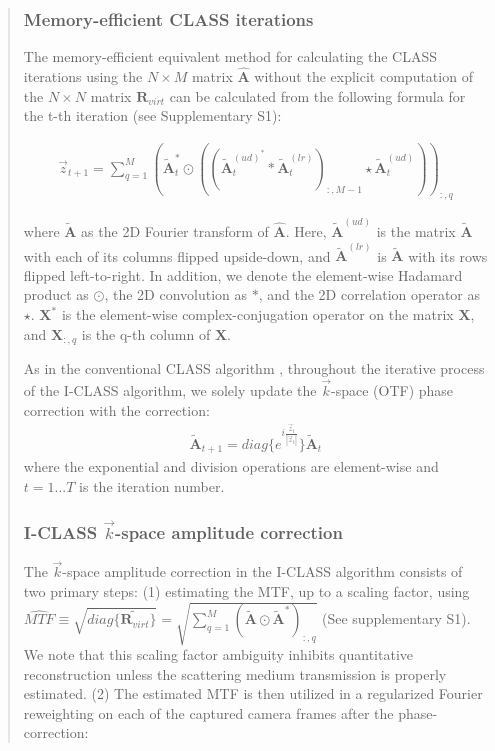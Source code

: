 \documentclass[12pt]{article}
\newenvironment{ourresponse}
    {\begin{tcolorbox}[width=\linewidth,breakable,enhanced,colback=gray!5,colframe=responsecolor!50,title=Response,left=5pt,right=5pt]}
    {\end{tcolorbox}}
\begin{document}
\begin{enumerate}[label=\arabic*.]
\begin{ourresponse}
\begin{quote}
            \subsubsection*{Memory-efficient CLASS iterations}
            
            The memory-efficient equivalent method for calculating the CLASS iterations using the $N \times M$ matrix $\hat{\textbf{A}}$ without the explicit computation of the $N \times N$ matrix $\textbf{R}_{virt}$ can be calculated from the following formula for the t-th iteration (see Supplementary S1): 
            
            \begin{eqnarray}
            \vec{z}_{t+1}=\sum_{q=1}^{M}(\tilde{\textbf{A}}_t^* \odot ((\tilde{\textbf{A}}_t^{(ud)^*}*\tilde{\textbf{A}}_t^{(lr)})_{:,M-1} \star \tilde{\textbf{A}}_t^{(ud)}))_{:,q}
            \label{eq:three}
            \end{eqnarray}
            
            \noindent where $\tilde{\textbf{A}}$ as the 2D Fourier transform of $\hat{\textbf{A}}$. Here, $\tilde{\textbf{A}}^{(ud)}$ is the matrix $\tilde{\textbf{A}}$ with each of its columns flipped upside-down, and $\tilde{\textbf{A}}^{(lr)}$ is $\tilde{\textbf{A}}$ with its rows flipped left-to-right. In addition, we denote the element-wise Hadamard product as $\odot$, the 2D convolution as $*$, and the 2D correlation operator as $\star$. $\textbf{X}^{*}$ is the element-wise complex-conjugation operator on the matrix $\textbf{X}$, and $\textbf{X}_{:,q}$ is the q-th column of $\textbf{X}$.
            
            As in the conventional CLASS algorithm \cite{kang17}, throughout the iterative process of the I-CLASS algorithm, we solely update the $\vec{k}$-space (OTF) phase correction with the correction:
            \begin{eqnarray}
            \tilde{\textbf{A}}_{t+1}=diag\{e^{i\frac{\vec{z}_t}{|\vec{z}_t|}}\}\tilde{\textbf{A}}_t
            \end{eqnarray}
            \noindent where the exponential and division operations are element-wise and $t=1...T$ is the iteration number. 
             \subsubsection*{I-CLASS $\vec{k}$-space amplitude correction}
            
            The $\vec{k}$-space amplitude correction in the I-CLASS algorithm consists of two primary steps: (1) estimating the MTF, up to a scaling factor, using $\widehat{MTF} \equiv  \sqrt{diag\{ \tilde{\textbf{R}_{virt}} \}} = \sqrt{\sum_{q=1}^{M} (\tilde{\textbf{A}} \odot \tilde{\textbf{A}}^*)_{:,q}}$ (See supplementary S1). We note that this scaling factor ambiguity inhibits quantitative reconstruction unless the scattering medium transmission is properly estimated. (2) The estimated MTF is then utilized in a regularized Fourier reweighting on each of the captured camera frames after the phase-correction:%
            

\end{quote}
\end{ourresponse}
\end{enumerate}
\end{document}

